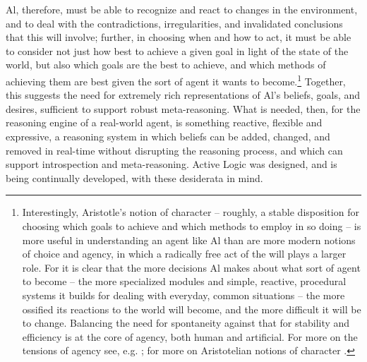 \documentclass[]{llncs}
\begin{document}
Al, therefore, must be able to recognize and react to changes in the
environment, and to deal with the contradictions, irregularities, and
invalidated conclusions that this will involve; further, in choosing when
and how to act, it must be able to consider not just how best to achieve a
given goal in light of the state of the world, but also which goals are the
best to achieve, and which methods of achieving them are best given the
sort of agent it wants to become.\footnote{Interestingly, Aristotle's
notion of character -- roughly, a stable disposition for choosing which goals
to achieve and which methods to employ in so doing -- is more useful in
understanding an agent like Al than are more modern notions of choice and
agency, in which a radically free act of the will plays a larger role.  For
it is clear that the more decisions Al makes about what sort of agent to
become -- the more specialized modules and simple, reactive, procedural
systems it builds for dealing with everyday, common situations -- the more
ossified its reactions to the world will become, and the more difficult it
will be to change.  Balancing the need for spontaneity against that for
stability and efficiency is at the core of agency, both human and
artificial.  For more on the tensions of agency see,
e.g. \cite{Bratman_Faces,Bratman/87:inten_plans_pract}; for more on
Aristotelian notions of character
\cite{Aristotle:Ethics,Broadie:Aristotle}.}  Together, this suggests the
need for extremely rich representations of Al's beliefs, goals, and
desires, sufficient to support robust meta-reasoning.  What is needed,
then, for the reasoning engine of a real-world agent, is something
reactive, flexible and expressive, a reasoning system in which beliefs can be
added, changed, and removed in real-time without disrupting the reasoning
process, and which can support introspection and meta-reasoning.  Active
Logic was designed, and is being continually developed, with these
desiderata in mind.
\end{document}
